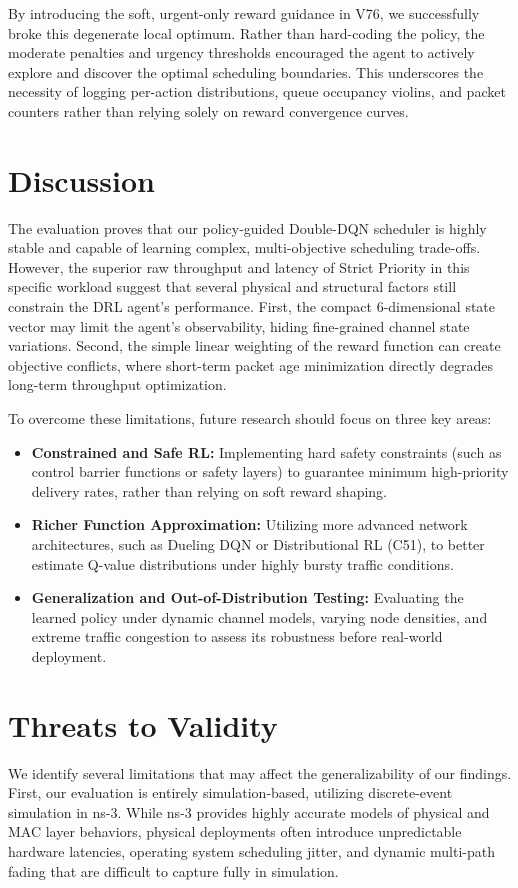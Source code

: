 \documentclass[runningheads,a4paper]{llncs}
\begin{document}
By introducing the soft, urgent-only reward guidance in V76, we successfully broke this degenerate local optimum. Rather than hard-coding the policy, the moderate penalties and urgency thresholds encouraged the agent to actively explore and discover the optimal scheduling boundaries. This underscores the necessity of logging per-action distributions, queue occupancy violins, and packet counters rather than relying solely on reward convergence curves.

\section{Discussion}
The evaluation proves that our policy-guided Double-DQN scheduler is highly stable and capable of learning complex, multi-objective scheduling trade-offs. However, the superior raw throughput and latency of Strict Priority in this specific workload suggest that several physical and structural factors still constrain the DRL agent's performance. First, the compact 6-dimensional state vector may limit the agent's observability, hiding fine-grained channel state variations. Second, the simple linear weighting of the reward function can create objective conflicts, where short-term packet age minimization directly degrades long-term throughput optimization.

To overcome these limitations, future research should focus on three key areas:
\begin{itemize}
    \item \textbf{Constrained and Safe RL:} Implementing hard safety constraints (such as control barrier functions or safety layers) to guarantee minimum high-priority delivery rates, rather than relying on soft reward shaping.
    \item \textbf{Richer Function Approximation:} Utilizing more advanced network architectures, such as Dueling DQN or Distributional RL (C51), to better estimate Q-value distributions under highly bursty traffic conditions.
    \item \textbf{Generalization and Out-of-Distribution Testing:} Evaluating the learned policy under dynamic channel models, varying node densities, and extreme traffic congestion to assess its robustness before real-world deployment.
\end{itemize}

\section{Threats to Validity}
We identify several limitations that may affect the generalizability of our findings. First, our evaluation is entirely simulation-based, utilizing discrete-event simulation in ns-3. While ns-3 provides highly accurate models of physical and MAC layer behaviors, physical deployments often introduce unpredictable hardware latencies, operating system scheduling jitter, and dynamic multi-path fading that are difficult to capture fully in simulation.
\end{document}
